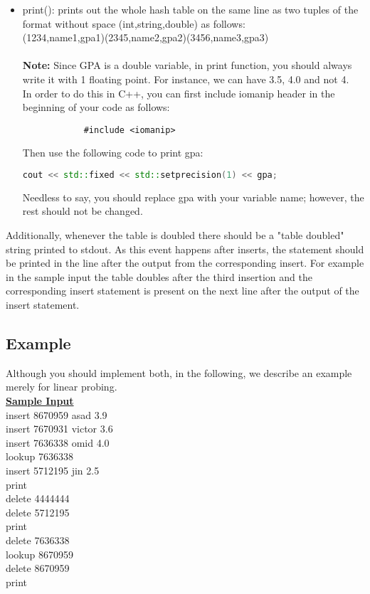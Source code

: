 \documentclass[times, 12pt]{article}
\begin{document}
\begin{itemize}
\begin{itemize}
        \item print(): prints out the whole hash table on the same line as two tuples of the format without space (int,string,double) as follows:\\
        (1234,name1,gpa1)(2345,name2,gpa2)(3456,name3,gpa3)\\\\
        \textbf{Note:} Since GPA is a double variable, in print function, you should always write it with 1 floating point. For instance, we can have 3.5, 4.0 and not 4.\\
        In order to do this in C++, you can first include iomanip header in the beginning of your code as follows:
        \begin{lstlisting}
            #include <iomanip>
        \end{lstlisting}
        
        Then use the following code to print gpa:
        
        \begin{lstlisting}[language=C++,
            directivestyle={\color{black}}
            emph={int,char,double,float,unsigned},
            emphstyle={\color{green}}
            ]
            cout << std::fixed << std::setprecision(1) << gpa;
        \end{lstlisting}
            
        Needless to say, you should replace gpa with your variable name; however, the rest should not be changed.
    \end{itemize}
\end{itemize}

Additionally, whenever the table is doubled there should be a "table doubled" string printed to stdout. As
this event happens after inserts, the statement should be printed in the line after the output from
the corresponding insert. For example in the sample input the table doubles after the third
insertion and the corresponding insert statement is present on the next line after the output of the insert statement.

\subsection*{Example}
Although you should implement both, in the following, we describe an example merely for linear probing.\\
\underline{\textbf{Sample Input}}\\
insert 8670959 asad 3.9\\
insert 7670931 victor 3.6\\
insert 7636338 omid 4.0\\
lookup 7636338\\
insert 5712195 jin 2.5\\
print\\
delete 4444444\\
delete 5712195\\
print\\
delete 7636338\\
lookup 8670959\\
delete 8670959\\
print\\
\end{document}
